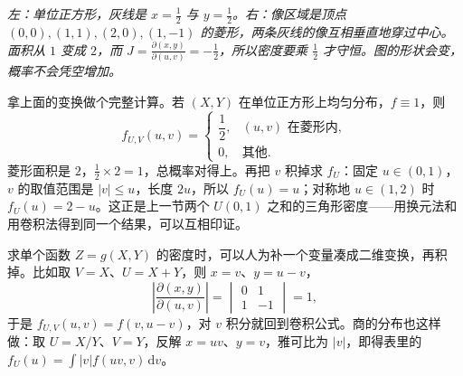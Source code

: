 \begin{center}
\par\vspace{2pt}
{\footnotesize\itshape 左：单位正方形，灰线是 $x=\frac12$ 与 $y=\frac12$。右：像区域是顶点 $(0,0),(1,1),(2,0),(1,-1)$ 的菱形，两条灰线的像互相垂直地穿过中心。面积从 $1$ 变成 $2$，而
$J=\frac{\partial(x,y)}{\partial(u,v)}=-\frac12$，所以密度要乘 $\frac12$ 才守恒。图的形状会变，概率不会凭空增加。}
\end{center}

拿上面的变换做个完整计算。若 $(X,Y)$ 在单位正方形上均匀分布，$f\equiv1$，则
\[
f_{U,V}(u,v)=\begin{cases}
\dfrac12, & (u,v)\text{ 在菱形内},\\[4pt]
0, & \text{其他}.
\end{cases}
\]
菱形面积是 $2$，$\frac12\times2=1$，总概率对得上。再把 $v$ 积掉求 $f_U$：固定 $u\in(0,1)$，$v$ 的取值范围是 $|v|\le u$，长度 $2u$，所以 $f_U(u)=u$；对称地 $u\in(1,2)$ 时 $f_U(u)=2-u$。这正是上一节两个 $U(0,1)$ 之和的三角形密度——用换元法和用卷积法得到同一个结果，可以互相印证。

求单个函数 $Z=g(X,Y)$ 的密度时，可以人为补一个变量凑成二维变换，再积掉。比如取 $V=X$、$U=X+Y$，则 $x=v$、$y=u-v$，
\[
\left|\frac{\partial(x,y)}{\partial(u,v)}\right|
=\begin{vmatrix}0 & 1\\ 1 & -1\end{vmatrix}=1 ,
\]
于是 $f_{U,V}(u,v)=f(v,u-v)$，对 $v$ 积分就回到卷积公式。商的分布也这样做：取 $U=X/Y$、$V=Y$，反解 $x=uv$、$y=v$，雅可比为 $|v|$，即得表里的 $f_U(u)=\int|v|f(uv,v)\,\mathrm dv$。


